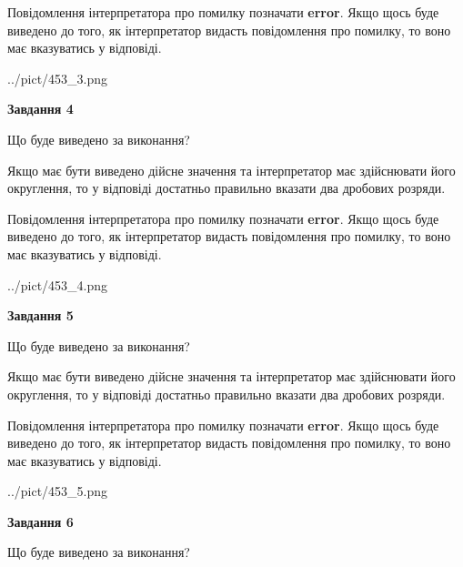 \documentclass[12pt, ukrainian]{article}
\begin{document}
{\begin {Large}
Повідомлення інтерпретатора про помилку позначати \textbf{error}.
Якщо щось буде виведено до того, як інтерпретатор видасть повідомлення про помилку, 
то воно має вказуватись у відповіді. \par

\begin{center}
	{../pict/453_3.png}
\end{center}
\newpage

{\begin {center}\textbf{Завдання 4}\end {center}}\par
Що буде виведено за виконання? \par

Якщо має бути виведено дійсне значення та інтерпретатор має здійснювати його округлення, 
то у відповіді достатньо правильно вказати два дробових розряди.

Повідомлення інтерпретатора про помилку позначати \textbf{error}.
Якщо щось буде виведено до того, як інтерпретатор видасть повідомлення про помилку, 
то воно має вказуватись у відповіді. \par

\begin{center}
	{../pict/453_4.png}
\end{center}
\newpage

{\begin {center}\textbf{Завдання 5}\end {center}}\par
Що буде виведено за виконання? \par

Якщо має бути виведено дійсне значення та інтерпретатор має здійснювати його округлення, 
то у відповіді достатньо правильно вказати два дробових розряди.

Повідомлення інтерпретатора про помилку позначати \textbf{error}.
Якщо щось буде виведено до того, як інтерпретатор видасть повідомлення про помилку, 
то воно має вказуватись у відповіді. \par

\begin{center}
	{../pict/453_5.png}
\end{center}
\newpage

{\begin {center}\textbf{Завдання 6}\end {center}}\par
Що буде виведено за виконання? \par


\end{Large}}
\end{document}
